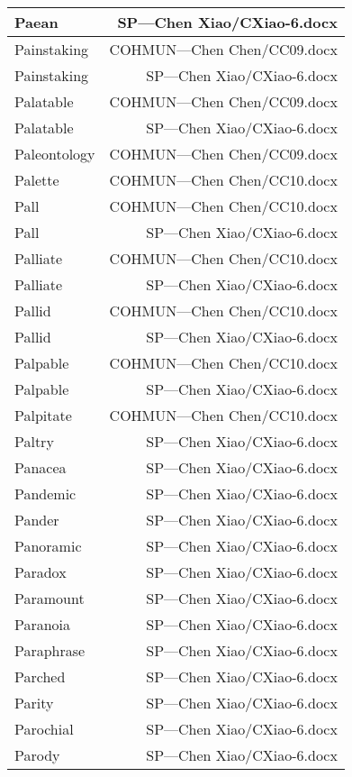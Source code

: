 \documentclass{article}
\begin{document}
\begin{center}
\begin{longtable}{|l|r|}
\hline
Paean  &  SP---Chen Xiao/CXiao-6.docx\\  
\hline
Painstaking  &  COHMUN---Chen Chen/CC09.docx\\  
\hline
Painstaking  &  SP---Chen Xiao/CXiao-6.docx\\  
\hline
Palatable  &  COHMUN---Chen Chen/CC09.docx\\  
\hline
Palatable  &  SP---Chen Xiao/CXiao-6.docx\\  
\hline
Paleontology  &  COHMUN---Chen Chen/CC09.docx\\  
\hline
Palette  &  COHMUN---Chen Chen/CC10.docx\\  
\hline
Pall  &  COHMUN---Chen Chen/CC10.docx\\  
\hline
Pall  &  SP---Chen Xiao/CXiao-6.docx\\  
\hline
Palliate  &  COHMUN---Chen Chen/CC10.docx\\  
\hline
Palliate  &  SP---Chen Xiao/CXiao-6.docx\\  
\hline
Pallid  &  COHMUN---Chen Chen/CC10.docx\\  
\hline
Pallid  &  SP---Chen Xiao/CXiao-6.docx\\  
\hline
Palpable  &  COHMUN---Chen Chen/CC10.docx\\  
\hline
Palpable  &  SP---Chen Xiao/CXiao-6.docx\\  
\hline
Palpitate  &  COHMUN---Chen Chen/CC10.docx\\  
\hline
Paltry  &  SP---Chen Xiao/CXiao-6.docx\\  
\hline
Panacea  &  SP---Chen Xiao/CXiao-6.docx\\  
\hline
Pandemic  &  SP---Chen Xiao/CXiao-6.docx\\  
\hline
Pander  &  SP---Chen Xiao/CXiao-6.docx\\  
\hline
Panoramic  &  SP---Chen Xiao/CXiao-6.docx\\  
\hline
Paradox  &  SP---Chen Xiao/CXiao-6.docx\\  
\hline
Paramount  &  SP---Chen Xiao/CXiao-6.docx\\  
\hline
Paranoia  &  SP---Chen Xiao/CXiao-6.docx\\  
\hline
Paraphrase  &  SP---Chen Xiao/CXiao-6.docx\\  
\hline
Parched  &  SP---Chen Xiao/CXiao-6.docx\\  
\hline
Parity  &  SP---Chen Xiao/CXiao-6.docx\\  
\hline
Parochial  &  SP---Chen Xiao/CXiao-6.docx\\  
\hline
Parody  &  SP---Chen Xiao/CXiao-6.docx\\  

\end{longtable}
\end{center}
\end{document}
